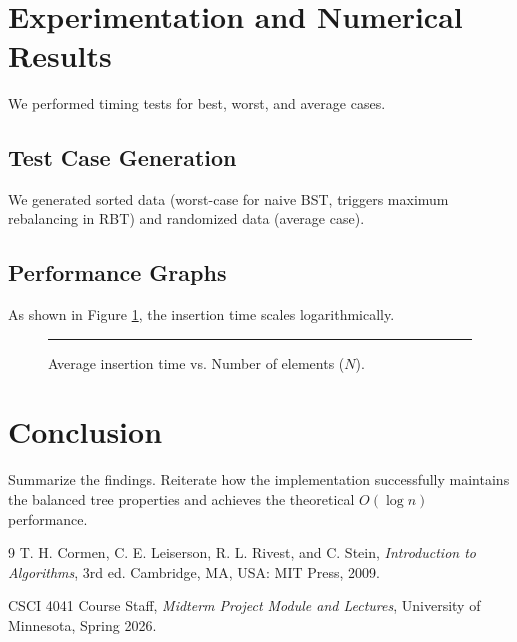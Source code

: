 \documentclass[11pt,a4paper]{article}
\begin{document}
\begin{lstlisting}[caption={Example of Delete Fix up}, label = lst:deleteFixUp]
    
\end{lstlisting}

\section{Experimentation and Numerical Results}
We performed timing tests for best, worst, and average cases. 

\subsection{Test Case Generation}
We generated sorted data (worst-case for naive BST, triggers maximum rebalancing in RBT) and randomized data (average case). 

\subsection{Performance Graphs}
As shown in Figure \ref{fig:runtime}, the insertion time scales logarithmically.

\begin{figure}[htbp]
    \centering
    \rule{0.8\textwidth}{0.3\textwidth} %
    \caption{Average insertion time vs. Number of elements ($N$).}
    \label{fig:runtime}
\end{figure}

\section{Conclusion}
Summarize the findings. Reiterate how the implementation successfully maintains the balanced tree properties and achieves the theoretical $O(\log n)$ performance.

\begin{thebibliography}{9}
T. H. Cormen, C. E. Leiserson, R. L. Rivest, and C. Stein, 
\textit{Introduction to Algorithms}, 3rd ed. 
Cambridge, MA, USA: MIT Press, 2009.

CSCI 4041 Course Staff, \textit{Midterm Project Module and Lectures}, University of Minnesota, Spring 2026.
\end{thebibliography}
\end{document}
